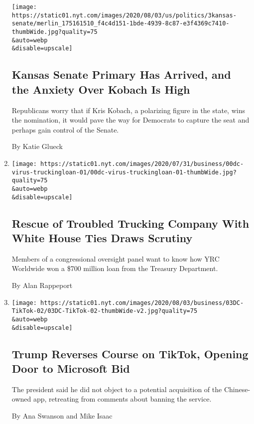 \begin{enumerate}
  \texttt{[image: https://static01.nyt.com/images/2020/08/03/us/politics/3kansas-senate/merlin\_175161510\_f4c4d151-1bde-4939-8c87-e3f4369c7410-thumbWide.jpg?quality=75\\\&auto=webp\\\&disable=upscale]}

  \hypertarget{kansas-senate-primary-has-arrived-and-the-anxiety-over-kobach-is-high}{%
  \subsection{Kansas Senate Primary Has Arrived, and the Anxiety Over
  Kobach Is
  High}\label{kansas-senate-primary-has-arrived-and-the-anxiety-over-kobach-is-high}}

  Republicans worry that if Kris Kobach, a polarizing figure in the
  state, wins the nomination, it would pave the way for Democrats to
  capture the seat and perhaps gain control of the Senate.

  By Katie Glueck
\item
  \href{/2020/08/03/us/politics/yrc-coronavirus-relief-funds.html}{}

  \texttt{[image: https://static01.nyt.com/images/2020/07/31/business/00dc-virus-truckingloan-01/00dc-virus-truckingloan-01-thumbWide.jpg?quality=75\\\&auto=webp\\\&disable=upscale]}

  \hypertarget{rescue-of-troubled-trucking-company-with-white-house-ties-draws-scrutiny-1}{%
  \subsection{Rescue of Troubled Trucking Company With White House Ties
  Draws
  Scrutiny}\label{rescue-of-troubled-trucking-company-with-white-house-ties-draws-scrutiny-1}}

  Members of a congressional oversight panel want to know how YRC
  Worldwide won a \$700 million loan from the Treasury Department.

  By Alan Rappeport
\item
  \href{/2020/08/03/technology/trump-tiktok-microsoft.html}{}

  \texttt{[image: https://static01.nyt.com/images/2020/08/03/business/03DC-TikTok-02/03DC-TikTok-02-thumbWide-v2.jpg?quality=75\\\&auto=webp\\\&disable=upscale]}

  \hypertarget{trump-reverses-course-on-tiktok-opening-door-to-microsoft-bid}{%
  \subsection{Trump Reverses Course on TikTok, Opening Door to Microsoft
  Bid}\label{trump-reverses-course-on-tiktok-opening-door-to-microsoft-bid}}

  The president said he did not object to a potential acquisition of the
  Chinese-owned app, retreating from comments about banning the service.

  By Ana Swanson and Mike Isaac
\end{enumerate}

